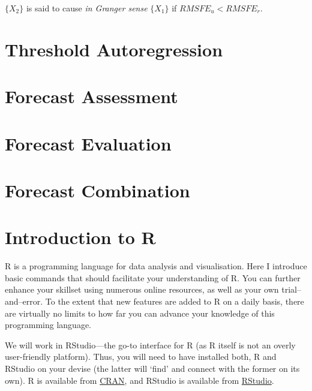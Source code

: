 \documentclass[
  oneside]{book}
\begin{document}
\(\{X_2\}\) is said to cause \emph{in Granger sense} \(\{X_1\}\) if \(RMSFE_{u} < RMSFE_{r}\).

\hypertarget{threshold-autoregression}{%
\chapter{Threshold Autoregression}\label{threshold-autoregression}}

\hypertarget{forecast-assessment}{%
\chapter*{Forecast Assessment}\label{forecast-assessment}}

\hypertarget{forecast-evaluation}{%
\chapter{Forecast Evaluation}\label{forecast-evaluation}}

\hypertarget{forecast-combination}{%
\chapter{Forecast Combination}\label{forecast-combination}}

\hypertarget{introduction-to-r}{%
\chapter*{Introduction to R}\label{introduction-to-r}}

R is a programming language for data analysis and visualisation. Here I introduce basic commands that should facilitate your understanding of R. You can further enhance your skillset using numerous online resources, as well as your own trial--and--error. To the extent that new features are added to R on a daily basis, there are virtually no limits to how far you can advance your knowledge of this programming language.

We will work in RStudio---the go-to interface for R (as R itself is not an overly user-friendly platform). Thus, you will need to have installed both, R and RStudio on your devise (the latter will `find' and connect with the former on its own). R is available from \href{https://cran.r-project.org/}{CRAN}, and RStudio is available from \href{https://www.rstudio.com/}{RStudio}.
\end{document}
